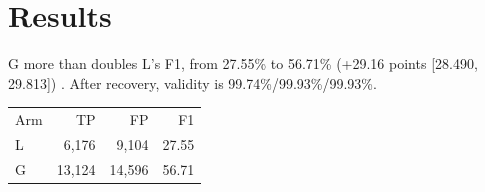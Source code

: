 \section{Results}
G more than doubles L's F1, from 27.55\% to 56.71\% (+29.16 points {[}28.490, 29.813{]}) \cite{r4}.
After recovery, validity is 99.74\%/99.93\%/99.93\%.
\begin{tabular}{lrrr}
Arm & TP & FP & F1 \\
L & 6,176 & 9,104 & 27.55 \\
G & 13,124 & 14,596 & 56.71 \\
\end{tabular}
